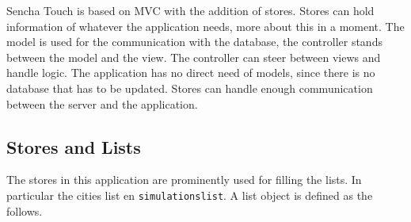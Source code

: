 Sencha Touch is based on MVC with the addition of stores. Stores can hold information of whatever the application needs, more about this in a moment. The model is used for the communication with the database, the controller stands between the model and the view. The controller can steer between views and handle logic. The application has no direct need of models, since there is no database that has to be updated. Stores can handle enough communication between the server and the application. 

\subsection{Stores and Lists}
\label{sec:storelist}
The stores in this application are prominently used for filling the lists. In particular the cities list en \texttt{simulationslist}. A list object is defined as the follows.

